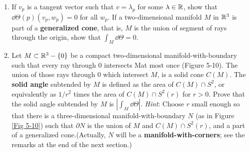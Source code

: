 \begin{problems}
{\begin{enumerate}[label=(\alph*)]
                For $r>0$ let $S^2(r)=\{x\in\F{R}^3:|x|=r\}$. Show that $\omega$ restricted to the  
                tangent space of $S^2(r)$ is $1/r^2$ times the volume element, and that $\int_{S^2(r)}\omega=4\pi$.
                Conclude that $\omega$ is not exact. Nevertheless we denoted $\omega$ by $\dd\Theta$ since, as we 
                shall see, $\dd\Theta$ is the analogue of the 1-form $\dd\theta$ on $\F{R}^2-\{0\}$.
            \item If $v_p$ is a tangent vector such that $v=\lambda_p$ for some $\lambda\in\mathbb{R}$, show that 
                $\dd\Theta(p)(v_p,w_p)=0$ for all $w_p$. If a two-dimensional manifold $M$ in $\mathbb{R}^3$ is
                part of a \textbf{generalized cone}, that is, $M$ is the union of segment of rays through the origin, show
                that $\int_M\dd\Theta =0$. 
            \item Let $M\subset\mathbb{R}^3-\{0\}$ be a compact two-dimensional manifold-with-boundary 
                such that every ray through 0 intersects Mat most once (Figure 5-10).
                The union of those rays through 0 which intersect $M$, is a solid cone $C(M)$. 
                The \textbf{solid angle} subtended by $M$ is defined as the area of $C(M)\cap S^2$, or 
                equivalently as $1/r^2$ times the area of $C(M)\cap S^2(r)$ for $r > 0$.
                Prove that the solid angle subtended by $M$ is $|\int_M\dd\Theta|$.
                \textit{Hint}: Choose $r$ small enough so that there is a three-dimensional 
                manifold-with-boundary $N$ (as in Figure \ref{Fig 5-10}) such that $\partial N$ is the 
                union of $M$ and $C(M)\cap S^2(r)$, and a part of a generalized cone.(Actually, $N$ 
                will be a \textbf{manifold-with-corners}; see the remarks at the end of the next section.)


\end{enumerate}}
\end{problems}

